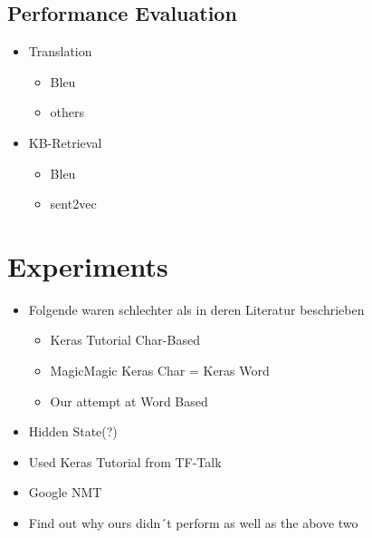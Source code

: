 \documentclass[10pt,a4paper,titlepage,twoside,english]{zhawreprt}
\begin{document}
\section{Performance Evaluation}\label{sec:Performance Evaluation}
\begin{itemize}
	\item Translation
	\begin{itemize}
		\item Bleu
		\item others
	\end{itemize}
	\item KB-Retrieval
	\begin{itemize}
		\item Bleu
		\item sent2vec
	\end{itemize}
\end{itemize}

\chapter{Experiments}\label{chp:Experiments}
\begin{itemize}
	\item Folgende waren schlechter als in deren Literatur beschrieben
	\begin{itemize}
		\item Keras Tutorial Char-Based
		\item MagicMagic Keras Char = Keras Word
		\item Our attempt at Word Based
	\end{itemize}
	\item Hidden State(?)
	\item Used Keras Tutorial from TF-Talk
	\item Google NMT
	\item Find out why ours didn´t perform as well as the above two
\end{itemize}
\end{document}
